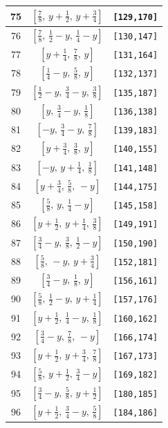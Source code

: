 \documentclass[fleqn,8pt]{jsarticle}
\begin{document}
\begin{longtable}{ccc}
75 & $\left[ \frac{7}{8},\, y + \frac{1}{2},\, y + \frac{3}{4} \right]$ & {\tt [129,170]} \\ \hline
76 & $\left[ \frac{7}{8},\, \frac{1}{2} - y,\, \frac{1}{4} - y \right]$ & {\tt [130,147]} \\ \hline
77 & $\left[ y + \frac{1}{4},\, \frac{7}{8},\, y \right]$ & {\tt [131,164]} \\ \hline
78 & $\left[ \frac{1}{4} - y,\, \frac{5}{8},\, y \right]$ & {\tt [132,137]} \\ \hline
79 & $\left[ \frac{1}{2} - y,\, \frac{3}{4} - y,\, \frac{3}{8} \right]$ & {\tt [135,187]} \\ \hline
80 & $\left[ y,\, \frac{3}{4} - y,\, \frac{1}{8} \right]$ & {\tt [136,138]} \\ \hline
81 & $\left[ - y,\, \frac{3}{4} - y,\, \frac{7}{8} \right]$ & {\tt [139,183]} \\ \hline
82 & $\left[ y + \frac{3}{4},\, \frac{3}{8},\, y \right]$ & {\tt [140,155]} \\ \hline
83 & $\left[ - y,\, y + \frac{1}{4},\, \frac{1}{8} \right]$ & {\tt [141,148]} \\ \hline
84 & $\left[ y + \frac{3}{4},\, \frac{5}{8},\, - y \right]$ & {\tt [144,175]} \\ \hline
85 & $\left[ \frac{5}{8},\, y,\, \frac{1}{4} - y \right]$ & {\tt [145,158]} \\ \hline
86 & $\left[ y + \frac{1}{2},\, y + \frac{1}{4},\, \frac{3}{8} \right]$ & {\tt [149,191]} \\ \hline
87 & $\left[ \frac{3}{4} - y,\, \frac{3}{8},\, \frac{1}{2} - y \right]$ & {\tt [150,190]} \\ \hline
88 & $\left[ \frac{5}{8},\, - y,\, y + \frac{3}{4} \right]$ & {\tt [152,181]} \\ \hline
89 & $\left[ \frac{3}{4} - y,\, \frac{1}{8},\, y \right]$ & {\tt [156,161]} \\ \hline
90 & $\left[ \frac{5}{8},\, \frac{1}{2} - y,\, y + \frac{1}{4} \right]$ & {\tt [157,176]} \\ \hline
91 & $\left[ y + \frac{1}{2},\, \frac{1}{4} - y,\, \frac{1}{8} \right]$ & {\tt [160,162]} \\ \hline
92 & $\left[ \frac{3}{4} - y,\, \frac{7}{8},\, - y \right]$ & {\tt [166,174]} \\ \hline
93 & $\left[ y + \frac{1}{2},\, y + \frac{3}{4},\, \frac{7}{8} \right]$ & {\tt [167,173]} \\ \hline
94 & $\left[ \frac{5}{8},\, y + \frac{1}{2},\, \frac{3}{4} - y \right]$ & {\tt [169,182]} \\ \hline
95 & $\left[ \frac{3}{4} - y,\, \frac{5}{8},\, y + \frac{1}{2} \right]$ & {\tt [180,185]} \\ \hline
96 & $\left[ y + \frac{1}{2},\, \frac{3}{4} - y,\, \frac{5}{8} \right]$ & {\tt [184,186]} \\
\end{longtable}
\end{document}
